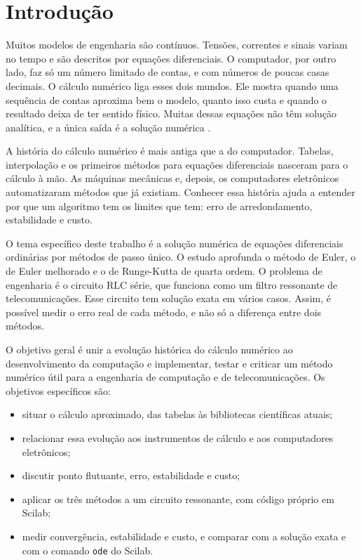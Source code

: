 \section{Introdução}

Muitos modelos de engenharia são contínuos. Tensões, correntes e sinais variam no tempo e são descritos por equações diferenciais. O computador, por outro lado, faz só um número limitado de contas, e com números de poucas casas decimais. O cálculo numérico liga esses dois mundos. Ele mostra quando uma sequência de contas aproxima bem o modelo, quanto isso custa e quando o resultado deixa de ter sentido físico. Muitas dessas equações não têm solução analítica, e a única saída é a solução numérica \cite[p.~177]{aquino2020}.

A história do cálculo numérico é mais antiga que a do computador. Tabelas, interpolação e os primeiros métodos para equações diferenciais nasceram para o cálculo à mão. As máquinas mecânicas e, depois, os computadores eletrônicos automatizaram métodos que já existiam. Conhecer essa história ajuda a entender por que um algoritmo tem os limites que tem: erro de arredondamento, estabilidade e custo.

O tema específico deste trabalho é a solução numérica de equações diferenciais ordinárias por métodos de passo único. O estudo aprofunda o método de Euler, o de Euler melhorado e o de Runge-Kutta de quarta ordem. O problema de engenharia é o circuito RLC série, que funciona como um filtro ressonante de telecomunicações. Esse circuito tem solução exata em vários casos. Assim, é possível medir o erro real de cada método, e não só a diferença entre dois métodos.

O objetivo geral é unir a evolução histórica do cálculo numérico ao desenvolvimento da computação e implementar, testar e criticar um método numérico útil para a engenharia de computação e de telecomunicações. Os objetivos específicos são:
\begin{itemize}
  \item situar o cálculo aproximado, das tabelas às bibliotecas científicas atuais;
  \item relacionar essa evolução aos instrumentos de cálculo e aos computadores eletrônicos;
  \item discutir ponto flutuante, erro, estabilidade e custo;
  \item aplicar os três métodos a um circuito ressonante, com código próprio em Scilab;
  \item medir convergência, estabilidade e custo, e comparar com a solução exata e com o comando \texttt{ode} do Scilab.
\end{itemize}


